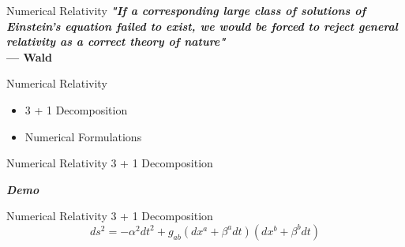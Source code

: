 \documentclass[xcolor=dvipsnames]{beamer}
\begin{document}
	\begin{frame}{Numerical Relativity}
		\textbf{\textit{"If a corresponding large class of solutions of Einstein’s equation failed to exist, we would be forced to reject general relativity as a correct theory of nature"}}\\
		\hfill \textbf{--- Wald}
	\end{frame}
	\begin{frame}{Numerical Relativity}
		\begin{itemize}
			\item{3 + 1 Decomposition}
			\item{Numerical Formulations}
		\end{itemize}
	\end{frame}
	\begin{frame}{Numerical Relativity}
		3 + 1 Decomposition
		\begin{center}
			\Huge{\textbf{\textit{Demo}}}
		\end{center}
	\end{frame}
	\begin{frame}{Numerical Relativity}
		3 + 1 Decomposition
		\Large
		\[
		ds^{2} = - \alpha^{2}dt^{2} + g_{ab}(dx^{a} + \beta^{a}dt)(dx^{b} + \beta^{b}dt) 		
		\]
	\end{frame}
\end{document}
